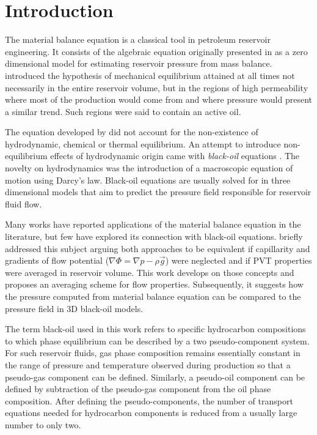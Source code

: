 \documentclass[final,authoryear,5p,twocolumn,10pt]{elsarticle}
\begin{document}
\section{Introduction}
The material balance equation is a classical tool in petroleum reservoir engineering. It consists of the algebraic equation originally presented in \cite{schilthuis1936active} as a zero dimensional model for estimating reservoir pressure from mass balance. \cite{schilthuis1936active} introduced the hypothesis of mechanical equilibrium attained at all times not necessarily in the entire reservoir volume, but in the regions of high permeability where most of the production would come from and where pressure would present a similar trend. Such regions were said to contain an active oil. 

The equation developed by \cite{schilthuis1936active} did not account for the non-existence of hydrodynamic, chemical or thermal equilibrium. An attempt to introduce non-equilibrium effects of hydrodynamic origin came with \textit{black-oil} equations \citep{aziz1979petroleum,blackoil}. The novelty on hydrodynamics was the introduction of a macroscopic equation of motion using Darcy's law. Black-oil equations are usually solved for in three dimensional models that aim to predict the pressure field responsible for reservoir fluid flow.

Many works have reported applications of the material balance equation in the literature, but few have explored its connection with black-oil equations. \cite{ertekin2001basic} briefly addressed this subject arguing both approaches to be equivalent if capillarity and gradients of flow potential ($\nabla \Phi = \nabla p - \rho \vec{g}$) were neglected and if PVT properties were averaged in reservoir volume. This work develops on those concepts and proposes an averaging scheme for flow properties. Subsequently, it suggests how the pressure computed from material balance equation can be compared to the pressure field in 3D black-oil models.


The term black-oil used in this work refers to specific hydrocarbon compositions to which phase equilibrium can be described by a two pseudo-component system. For such reservoir fluids, gas phase composition remains essentially constant in the range of pressure and temperature observed during production so that a pseudo-gas component can be defined. Similarly, a pseudo-oil component can be defined by subtraction of the pseudo-gas component from the oil phase composition. After defining the pseudo-components, the number of transport equations needed for hydrocarbon components is reduced from a usually large number to only two.
\end{document}
